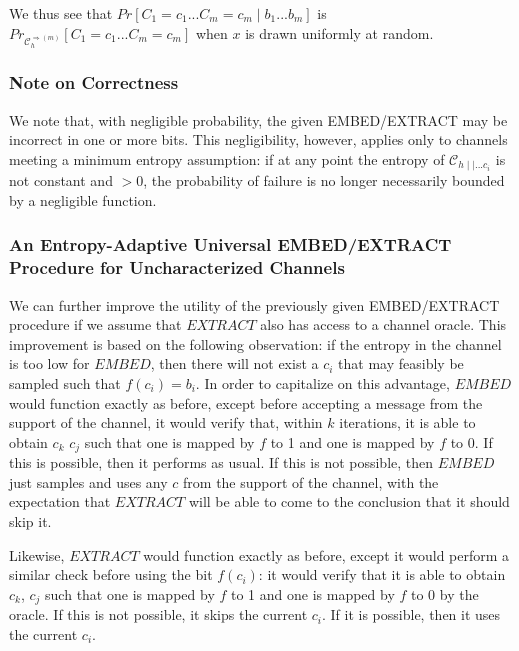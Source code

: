 \documentclass{article}
\begin{document}
We thus see that $Pr[C_1 = c_1 ... C_m = c_m \mid b_1 ... b_m]$ is $Pr_{\mathcal{C}_h^{\Rightarrow(m)}}[C_1 = c_1 ... C_m = c_m]$ when 
$x$ is drawn uniformly at random.

\subsubsection{Note on Correctness}

We note that, with negligible probability, the given EMBED/EXTRACT may be incorrect in one or more bits.  This negligibility, however, applies
only to channels meeting a minimum entropy assumption: if at any point the entropy of $\mathcal{C}_{h\mid\mid...c_i}$ is not constant and $ > 0$, 
the probability of failure is no longer necessarily bounded by a negligible function.

\subsubsection{An Entropy-Adaptive Universal EMBED/EXTRACT Procedure for Uncharacterized Channels}

We can further improve the utility of the previously given EMBED/EXTRACT procedure if we assume that $EXTRACT$ also has access to a channel oracle.
This improvement is based on the following observation: if the entropy in the channel is too low for $EMBED$, then there will not exist a $c_i$ that 
may feasibly be sampled such that $f(c_i) = b_i$.
\newline\newline
In order to capitalize on this advantage, $EMBED$ would function exactly as before, except before accepting a message from the support of the 
channel, it would verify that, within $k$ iterations, it is able to obtain $c_k$ $c_j$ such that one is mapped by $f$ to 1 and one is mapped by 
$f$ to 0.  If this is possible, then it performs as usual.  If this is not possible, then $EMBED$ just samples and uses any $c$ from the support 
of the channel, with the expectation that $EXTRACT$ will be able to come to the conclusion that it should skip it.

Likewise, $EXTRACT$ would function exactly as before, except it would perform a similar check before using the bit $f(c_i)$: it would verify that 
it is able to obtain $c_k$, $c_j$ such that one is mapped by $f$ to 1 and one is mapped by $f$ to 0 by the oracle.  If this is not possible, it skips 
the current $c_i$.  If it is possible, then it uses the current $c_i$.  
\end{document}
